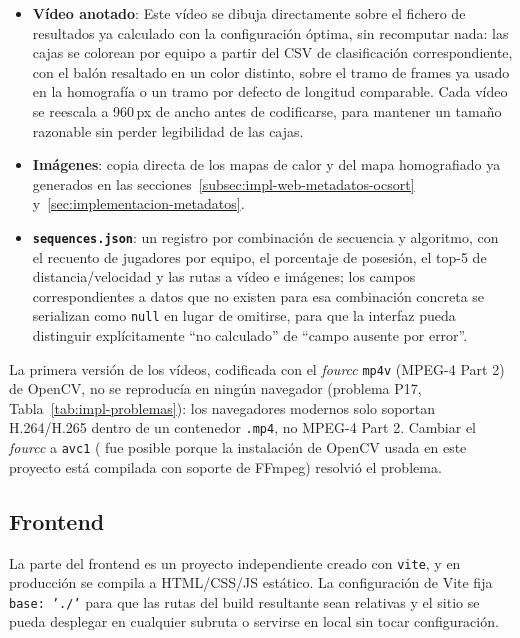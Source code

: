 \begin{itemize}
\item \textbf{Vídeo anotado}: Este vídeo se dibuja
  directamente sobre el fichero de resultados ya calculado con la
  configuración óptima, sin recomputar nada: las cajas se colorean por
  equipo a partir del CSV de clasificación correspondiente, con el balón
  resaltado en un color distinto, sobre el tramo de frames ya usado en la
  homografía o un tramo por
  defecto de longitud comparable. Cada vídeo se reescala a 960\,px de ancho
  antes de codificarse, para mantener un tamaño razonable sin perder
  legibilidad de las cajas.
\item \textbf{Imágenes}: copia directa de los mapas de calor y del mapa
  homografiado ya generados en las secciones~\ref{subsec:impl-web-metadatos-ocsort}
  y~\ref{sec:implementacion-metadatos}.
\item \textbf{\texttt{sequences.json}}: un registro por combinación de
  secuencia y algoritmo, con el recuento de jugadores por equipo, el
  porcentaje de posesión, el top-5 de distancia/velocidad y las rutas a
  vídeo e imágenes; los campos correspondientes a datos que no existen
  para esa combinación concreta se serializan como \texttt{null} en lugar de omitirse, para
  que la interfaz pueda distinguir explícitamente \enquote{no calculado} de
  \enquote{campo ausente por error}.
\end{itemize}

La primera versión de los vídeos, codificada con el \emph{fourcc}
\texttt{mp4v} (MPEG-4 Part 2) de OpenCV, no se reproducía en ningún
navegador (problema P17, Tabla~\ref{tab:impl-problemas}): los navegadores
modernos solo soportan H.264/H.265 dentro de un contenedor
\texttt{.mp4}, no MPEG-4 Part 2. Cambiar el \emph{fourcc} a
\texttt{avc1} ( fue posible porque la instalación de OpenCV usada en este
proyecto está compilada con soporte de FFmpeg) resolvió el problema.

\subsection{Frontend}
\label{subsec:impl-web-frontend}

La parte del frontend es un proyecto independiente creado con
\texttt{vite}, y en producción se compila a HTML/CSS/JS estático.
La configuración de Vite fija \texttt{base:
'./'} para que las rutas del build resultante sean relativas y el sitio
se pueda desplegar en cualquier subruta o servirse en local sin tocar
configuración.

